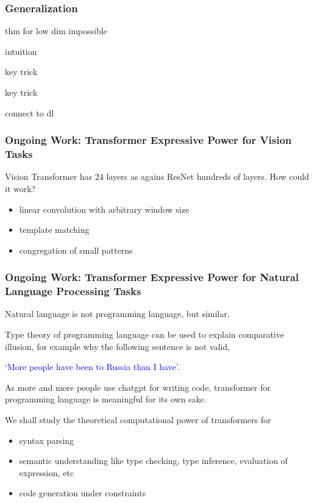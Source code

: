 \documentclass{beamer}   	%
\theoremstyle{definition}
\begin{document}
\begin{frame}
\frametitle{Generalization}
\end{frame}

\begin{frame}
	thm for low dim impossible
\end{frame}

\begin{frame}
	intuition
\end{frame}

\begin{frame}
	key trick
\end{frame}

\begin{frame}
	key trick
\end{frame}

\begin{frame}
	connect to dl
\end{frame}

\begin{frame}
\frametitle{Ongoing Work: Transformer Expressive Power for Vision Tasks}
Vision Transformer has 24 layers as agains ResNet hundreds of layers. How could it work?
\begin{itemize}
	\item linear convolution with arbitrary window size
	\item template matching
	\item congregation of small patterns
\end{itemize}
\frametitle{Ongoing Work: Transformer Expressive Power for Natural Language Processing Tasks}
\end{frame}

\begin{frame}
Natural language is not programming language, but similar.

Type theory of programming language can be used to explain comparative illusion, for example why the following sentence is not valid,


	\textcolor{blue}{`More people have been to Russia than I have'}.

As more and more people use chatgpt for writing code, transformer for programming language is meaningful for its own sake.

We shall study the theoretical computational power of transformers for
\begin{itemize}
	\item syntax parsing
	\item semantic understanding like type checking, type inference, evaluation of expression, etc
	\item code generation under constraints
\end{itemize}
\end{frame}
\end{document}
